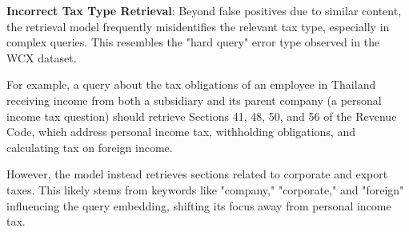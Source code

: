 \textbf{Incorrect Tax Type Retrieval}: Beyond false positives due to similar content, the retrieval model frequently misidentifies the relevant tax type, especially in complex queries. This resembles the "hard query" error type observed in the WCX dataset.

For example, a query about the tax obligations of an employee in Thailand receiving income from both a subsidiary and its parent company (a personal income tax question) should retrieve Sections 41, 48, 50, and 56 of the Revenue Code, which address personal income tax, withholding obligations, and calculating tax on foreign income.

However, the model instead retrieves sections related to corporate and export taxes. This likely stems from keywords like "company," "corporate," and "foreign" influencing the query embedding, shifting its focus away from personal income tax.


